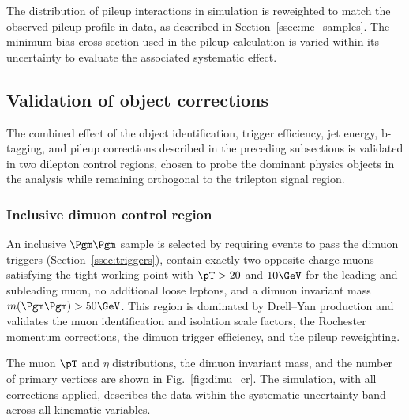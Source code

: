 The distribution of pileup interactions in simulation is reweighted to match the observed pileup profile in data, as described in Section~\ref{ssec:mc_samples}. The minimum bias cross section used in the pileup calculation is varied within its uncertainty to evaluate the associated systematic effect.

\subsection{Validation of object corrections}
\label{ssec:validation}

The combined effect of the object identification, trigger efficiency, jet energy, b-tagging, and pileup corrections described in the preceding subsections is validated in two dilepton control regions, chosen to probe the dominant physics objects in the analysis while remaining orthogonal to the trilepton signal region.

\subsubsection*{Inclusive dimuon control region}

An inclusive $\Pgm\Pgm$ sample is selected by requiring events to pass the dimuon triggers (Section~\ref{ssec:triggers}), contain exactly two opposite-charge muons satisfying the tight working point with $\pT > 20$ and $10\GeV$ for the leading and subleading muon, no additional loose leptons, and a dimuon invariant mass $m(\Pgm\Pgm) > 50\GeV$. This region is dominated by Drell--Yan production and validates the muon identification and isolation scale factors, the Rochester momentum corrections, the dimuon trigger efficiency, and the pileup reweighting.

The muon $\pT$ and $\eta$ distributions, the dimuon invariant mass, and the number of primary vertices are shown in Fig.~\ref{fig:dimu_cr}. The simulation, with all corrections applied, describes the data within the systematic uncertainty band across all kinematic variables.

